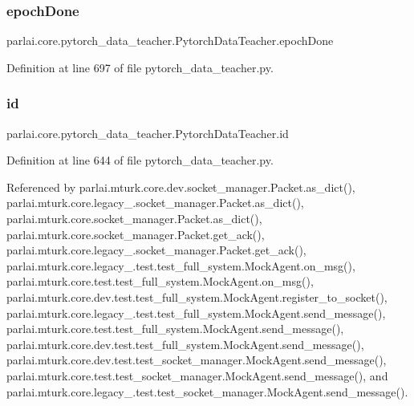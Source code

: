 \subsubsection{\texorpdfstring{epoch\+Done}{epochDone}}
{\footnotesize\ttfamily parlai.\+core.\+pytorch\+\_\+data\+\_\+teacher.\+Pytorch\+Data\+Teacher.\+epoch\+Done}



Definition at line 697 of file pytorch\+\_\+data\+\_\+teacher.\+py.

\mbox{\label{classparlai_1_1core_1_1pytorch__data__teacher_1_1PytorchDataTeacher_a02d5ad126f990d4fbe4c1140fe3e73d8}} 
\subsubsection{\texorpdfstring{id}{id}}
{\footnotesize\ttfamily parlai.\+core.\+pytorch\+\_\+data\+\_\+teacher.\+Pytorch\+Data\+Teacher.\+id}



Definition at line 644 of file pytorch\+\_\+data\+\_\+teacher.\+py.



Referenced by parlai.\+mturk.\+core.\+dev.\+socket\+\_\+manager.\+Packet.\+as\+\_\+dict(), parlai.\+mturk.\+core.\+legacy\+\_.\+socket\+\_\+manager.\+Packet.\+as\+\_\+dict(), parlai.\+mturk.\+core.\+socket\+\_\+manager.\+Packet.\+as\+\_\+dict(), parlai.\+mturk.\+core.\+socket\+\_\+manager.\+Packet.\+get\+\_\+ack(), parlai.\+mturk.\+core.\+legacy\+\_.\+socket\+\_\+manager.\+Packet.\+get\+\_\+ack(), parlai.\+mturk.\+core.\+legacy\+\_.\+test.\+test\+\_\+full\+\_\+system.\+Mock\+Agent.\+on\+\_\+msg(), parlai.\+mturk.\+core.\+test.\+test\+\_\+full\+\_\+system.\+Mock\+Agent.\+on\+\_\+msg(), parlai.\+mturk.\+core.\+dev.\+test.\+test\+\_\+full\+\_\+system.\+Mock\+Agent.\+register\+\_\+to\+\_\+socket(), parlai.\+mturk.\+core.\+legacy\+\_.\+test.\+test\+\_\+full\+\_\+system.\+Mock\+Agent.\+send\+\_\+message(), parlai.\+mturk.\+core.\+test.\+test\+\_\+full\+\_\+system.\+Mock\+Agent.\+send\+\_\+message(), parlai.\+mturk.\+core.\+dev.\+test.\+test\+\_\+full\+\_\+system.\+Mock\+Agent.\+send\+\_\+message(), parlai.\+mturk.\+core.\+dev.\+test.\+test\+\_\+socket\+\_\+manager.\+Mock\+Agent.\+send\+\_\+message(), parlai.\+mturk.\+core.\+test.\+test\+\_\+socket\+\_\+manager.\+Mock\+Agent.\+send\+\_\+message(), and parlai.\+mturk.\+core.\+legacy\+\_.\+test.\+test\+\_\+socket\+\_\+manager.\+Mock\+Agent.\+send\+\_\+message().

